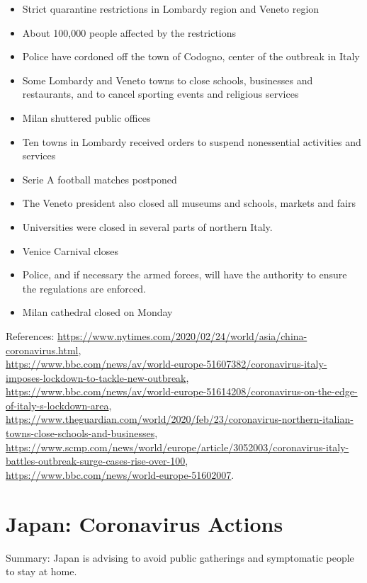 \documentclass[onecolumn,journal]{IEEEtran}
\begin{document}
\begin{itemize}
\item Strict quarantine restrictions in Lombardy region and Veneto region
\item About 100,000 people affected by the restrictions
\item Police have cordoned off the town of Codogno, center of the outbreak in Italy
\item Some Lombardy and Veneto towns to close schools, businesses and restaurants, and to cancel sporting events and religious services
\item Milan shuttered public offices
\item Ten towns in Lombardy received orders to suspend nonessential activities and services
\item Serie A football matches postponed
\item The Veneto president also closed all museums and schools, markets and fairs
\item Universities were closed in several parts of northern Italy.
\item Venice Carnival closes
\item Police, and if necessary the armed forces, will have the authority to ensure the regulations are enforced.
\item Milan cathedral closed on Monday
\end{itemize}
 
References: \url{https://www.nytimes.com/2020/02/24/world/asia/china-coronavirus.html},\\
\url{https://www.bbc.com/news/av/world-europe-51607382/coronavirus-italy-imposes-lockdown-to-tackle-new-outbreak}, \\
\url{https://www.bbc.com/news/av/world-europe-51614208/coronavirus-on-the-edge-of-italy-s-lockdown-area},\\
\url{https://www.theguardian.com/world/2020/feb/23/coronavirus-northern-italian-towns-close-schools-and-businesses},\\
\url{https://www.scmp.com/news/world/europe/article/3052003/coronavirus-italy-battles-outbreak-surge-cases-rise-over-100},\\
\url{https://www.bbc.com/news/world-europe-51602007}.

\section*{Japan: Coronavirus Actions}

Summary: Japan is advising to avoid public gatherings and symptomatic people to stay at home.
\end{document}
